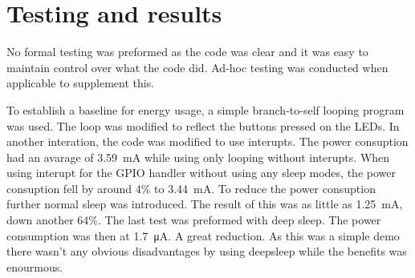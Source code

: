 \section{Testing and results}
No formal testing was preformed as the code was clear and it was easy to maintain control over what the code did.
Ad-hoc testing was conducted when applicable to supplement this.

To establish a baseline for energy usage, a simple branch-to-self looping program was used.
The loop was modified to reflect the buttons pressed on the LEDs.
In another interation, the code was modified to use interupts.
The power consuption had an avarage of \SI{3.59}{\milli\ampere} while using only looping without interupts. 
When using interupt for the GPIO handler without using any sleep modes, the power consuption fell by around 4\% to \SI{3.44}{\milli\ampere}.
To reduce the power consuption further normal sleep was introduced.
The result of this was as little as \SI{1.25}{\milli\ampere}, down another 64\%.
The last test was preformed with deep sleep.
The power consumption was then at \SI{1.7}{\micro\ampere}.
A great reduction.
As this was a simple demo there wasn't any obvious disadvantages by using deepsleep while the benefits was enourmous.
